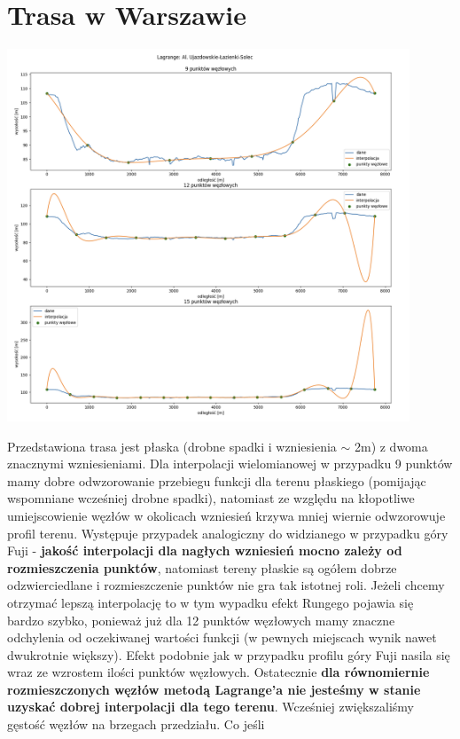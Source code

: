\documentclass{article}
\begin{document}
\section{Trasa w Warszawie}
 \begin{center}
	\includegraphics[width=12cm]{lagrange_wwa_uniform}
\end{center}
Przedstawiona trasa jest płaska (drobne spadki i wzniesienia $\sim$ 2m) z dwoma znacznymi wzniesieniami. Dla interpolacji wielomianowej w przypadku 
9 punktów mamy dobre odwzorowanie przebiegu funkcji dla terenu płaskiego (pomijając wspomniane wcześniej drobne spadki), natomiast ze względu na
kłopotliwe umiejscowienie węzłów w okolicach wzniesień krzywa mniej wiernie odwzorowuje profil terenu.  Występuje przypadek analogiczny do widzianego
w przypadku góry Fuji - \textbf{jakość interpolacji dla nagłych wzniesień mocno zależy od rozmieszczenia punktów}, natomiast tereny płaskie są ogółem dobrze odzwierciedlane i rozmieszczenie punktów nie gra tak istotnej roli.  Jeżeli chcemy otrzymać lepszą interpolację to w tym wypadku efekt Rungego pojawia się
bardzo szybko, ponieważ już dla 12 punktów węzłowych mamy znaczne odchylenia od oczekiwanej wartości funkcji (w pewnych miejscach wynik nawet dwukrotnie większy).
Efekt podobnie jak w przypadku profilu góry Fuji nasila się wraz ze wzrostem ilości punktów węzłowych. Ostatecznie \textbf{dla równomiernie rozmieszczonych węzłów
metodą Lagrange'a nie jesteśmy w stanie uzyskać dobrej interpolacji dla tego terenu}.  Wcześniej zwiększaliśmy gęstość węzłów na brzegach przedziału. Co jeśli 
\end{document}
